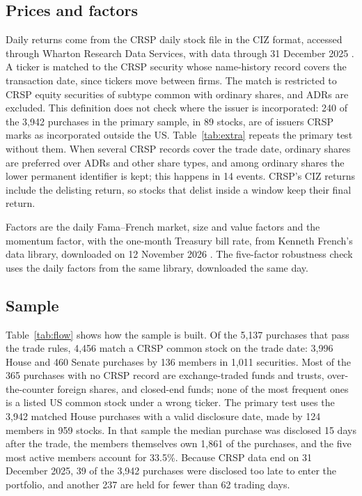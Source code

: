 \documentclass[11pt]{article}
\begin{document}
\subsection{Prices and factors}

Daily returns come from the CRSP daily stock file in the CIZ format, accessed through Wharton Research Data Services, with data through 31 December 2025 \citep{crsp2026daily}. A ticker is matched to the CRSP security whose name-history record covers the transaction date, since tickers move between firms. The match is restricted to CRSP equity securities of subtype common with ordinary shares, and ADRs are excluded. This definition does not check where the issuer is incorporated: 240 of the 3,942 purchases in the primary sample, in 89 stocks, are of issuers CRSP marks as incorporated outside the US. Table~\ref{tab:extra} repeats the primary test without them. When several CRSP records cover the trade date, ordinary shares are preferred over ADRs and other share types, and among ordinary shares the lower permanent identifier is kept; this happens in 14 events. CRSP's CIZ returns include the delisting return, so stocks that delist inside a window keep their final return.

Factors are the daily Fama--French market, size and value factors and the momentum factor, with the one-month Treasury bill rate, from Kenneth French's data library, downloaded on 12 November 2026 \citep{fama1993common,carhart1997persistence,french2026data}. The five-factor robustness check uses the daily \citet{fama2015five} factors from the same library, downloaded the same day.

\subsection{Sample}

Table~\ref{tab:flow} shows how the sample is built. Of the 5,137 purchases that pass the trade rules, 4,456 match a CRSP common stock on the trade date: 3,996 House and 460 Senate purchases by 136 members in 1,011 securities. Most of the 365 purchases with no CRSP record are exchange-traded funds and trusts, over-the-counter foreign shares, and closed-end funds; none of the most frequent ones is a listed US common stock under a wrong ticker. The primary test uses the 3,942 matched House purchases with a valid disclosure date, made by 124 members in 959 stocks. In that sample the median purchase was disclosed 15 days after the trade, the members themselves own 1,861 of the purchases, and the five most active members account for 33.5\%. Because CRSP data end on 31 December 2025, 39 of the 3,942 purchases were disclosed too late to enter the portfolio, and another 237 are held for fewer than 62 trading days.
\end{document}
